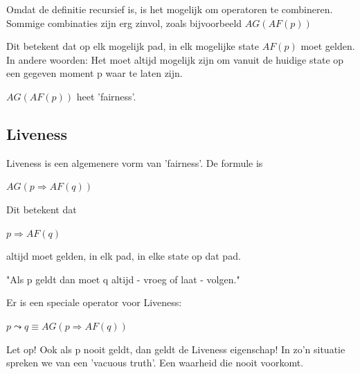 \documentclass{article}
\begin{document}
		Omdat de definitie recursief is, is het mogelijk om operatoren te combineren. Sommige combinaties zijn erg zinvol, zoals bijvoorbeeld \( AG ( AF (p) )\)

		Dit betekent dat op elk mogelijk pad, in elk mogelijke state \( AF(p) \) moet gelden. In andere woorden: Het moet altijd mogelijk zijn om vanuit de huidige state op een gegeven moment p waar te laten zijn. 

		\( AG ( AF ( p ) ) \) heet 'fairness'.
		
		\subsection{Liveness}
			
		Liveness is een algemenere vorm van 'fairness'. De formule is 

		\( AG (p \Rightarrow AF(q)) \) 

		Dit betekent dat 

		 \( p \Rightarrow AF(q) \) 

		altijd moet gelden, in elk pad, in elke state op dat pad.

		"Als p geldt dan moet q altijd - vroeg of laat - volgen."

		Er is een speciale operator voor Liveness:

		\( p \leadsto q \equiv AG (p \Rightarrow AF (q) ) \)

		Let op! Ook als p nooit geldt, dan geldt de Liveness eigenschap! In zo'n situatie spreken we van een 'vacuous truth'. Een waarheid die nooit voorkomt.
		
	
	\newpage
	
	
	
	
\end{document}
